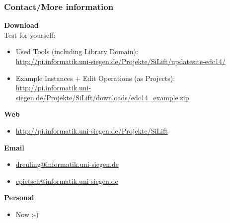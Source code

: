   \begin{frame}
 \frametitle{Contact/More information}
 \textbf{Download}\\
 Test for yourself:
 \begin{itemize}
   \item Used Tools (including Library Domain): \\
  \url{http://pi.informatik.uni-siegen.de/Projekte/SiLift/updatesite-edc14/}
  \item Example Instances + Edit Operations (as Projects): \\
    \url{http://pi.informatik.uni-siegen.de/Projekte/SiLift/downloads/edc14_example.zip}
 \end{itemize}
  \textbf{Web}
  \begin{itemize}
    \item \url{http://pi.informatik.uni-siegen.de/Projekte/SiLift}
  \end{itemize}
  \textbf{Email}
  \begin{itemize}
    \item \url{dreuling@informatik.uni-siegen.de} 
    \item \url{cpietsch@informatik.uni-siegen.de} 
  \end{itemize}
  \textbf{Personal}
  \begin{itemize}
    \item Now ;-)
  \end{itemize}
  \end{frame}
